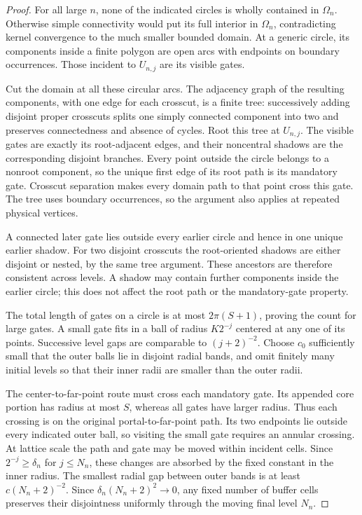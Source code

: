 \begin{proof}
For all large \(n\), none of the indicated circles is
wholly contained in \(\Omega_n\). Otherwise simple
connectivity would put its full interior in \(\Omega_n\),
contradicting kernel convergence to the much smaller
bounded domain. At a generic circle, its components
inside a finite polygon are open arcs with endpoints
on boundary occurrences. Those incident to \(U_{n,j}\)
are its visible gates.

Cut the domain at all these circular arcs. The adjacency
graph of the resulting components, with one edge for each
crosscut, is a finite tree: successively adding disjoint
proper crosscuts splits one simply connected component
into two and preserves connectedness and absence of cycles.
Root this tree at \(U_{n,j}\). The visible gates are exactly
its root-adjacent edges, and their noncentral shadows are
the corresponding disjoint branches. Every point outside
the circle belongs to a nonroot component, so the unique
first edge of its root path is its mandatory gate.
Crosscut separation makes every domain path to that point
cross this gate. The tree uses boundary occurrences, so
the argument also applies at repeated physical vertices.

A connected later gate lies outside every earlier circle
and hence in one unique earlier shadow. For two disjoint
crosscuts the root-oriented shadows are either disjoint or
nested, by the same tree argument. These ancestors are
therefore consistent across levels. A shadow may contain
further components inside the earlier circle; this does not
affect the root path or the mandatory-gate property.

The total length of gates on a circle is at most
\(2\pi(S+1)\), proving the count for large gates.
A small gate fits in a ball of radius \(K2^{-j}\)
centered at any one of its points. Successive level
gaps are comparable to \((j+2)^{-2}\). Choose \(c_0\)
sufficiently small that the outer balls lie in
disjoint radial bands, and omit finitely many initial
levels so that their inner radii are smaller than the
outer radii.

The center-to-far-point route must cross each mandatory
gate. Its appended core portion has radius at most \(S\),
whereas all gates have larger radius. Thus each crossing
is on the original portal-to-far-point path. Its two
endpoints lie outside every indicated outer ball, so
visiting the small gate requires an annular crossing.
At lattice scale the path and gate may be moved within
incident cells. Since \(2^{-j}\ge\delta_n\) for
\(j\le N_n\), these changes are absorbed by the fixed
constant in the inner radius. The smallest radial gap
between outer bands is at least \(c(N_n+2)^{-2}\).
Since \(\delta_n(N_n+2)^2\to0\), any fixed number of
buffer cells preserves their disjointness uniformly
through the moving final level \(N_n\).
\end{proof}

